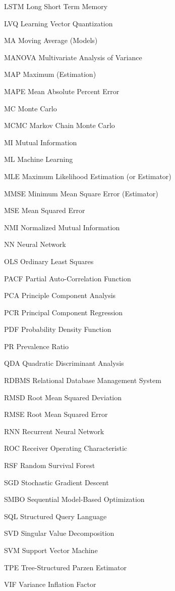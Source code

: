 \begin{symbollist}
  \item[LSTM] Long Short Term Memory
  \item[LVQ] Learning Vector Quantization
  \item[MA] Moving Average (Models)
  \item[MANOVA] Multivariate Analysis of Variance
  \item[MAP] Maximum \aposteriori (Estimation)
  \item[MAPE] Mean Absolute Percent Error
  \item[MC] Monte Carlo
  \item[MCMC] Markov Chain Monte Carlo
  \item[MI] Mutual Information
  \item[ML] Machine Learning
  \item[MLE] Maximum Likelihood Estimation (or Estimator)
  \item[MMSE] Minimum Mean Square Error (Estimator)
  \item[MSE] Mean Squared Error
  \item[NMI] Normalized Mutual Information
  \item[NN] Neural Network
  \item[OLS] Ordinary Least Squares
  \item[PACF] Partial Auto-Correlation Function
  \item[PCA] Principle Component Analysis
  \item[PCR] Principal Component Regression
  \item[PDF] Probability Density Function
  \item[PR] Prevalence Ratio
  \item[QDA] Quadratic Discriminant Analysis
  \item[RDBMS] Relational Database Management System
  \item[RMSD] Root Mean Squared Deviation
  \item[RMSE] Root Mean Squared Error
  \item[RNN] Recurrent Neural Network
  \item[ROC] Receiver Operating Characteristic
  \item[RSF] Random Survival Forest
  \item[SGD] Stochastic Gradient Descent
  \item[SMBO] Sequential Model-Based Optimization
  \item[SQL] Structured Query Language
  \item[SVD] Singular Value Decomposition
  \item[SVM] Support Vector Machine
  \item[TPE] Tree-Structured Parzen Estimator
  \item[VIF] Variance Inflation Factor
\end{symbollist}

